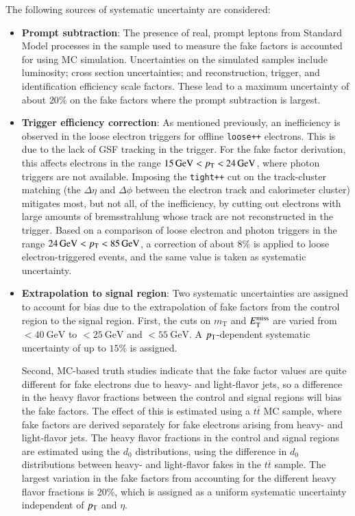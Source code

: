The following sources of systematic uncertainty are considered:
\begin{itemize}
  \item \textbf{Prompt subtraction}: The presence of real, prompt leptons from Standard Model processes in the sample used to measure the fake factors is accounted for using MC simulation. Uncertainties on the simulated samples include luminosity; cross section uncertainties; and reconstruction, trigger, and identification efficiency scale factors. These lead to a maximum uncertainty of about $20\%$ on the fake factors where the prompt subtraction is largest. 
  \item \textbf{Trigger efficiency correction}: As mentioned previously, an inefficiency is observed in the loose electron triggers for offline \texttt{loose++} electrons. This is due to the lack of GSF tracking in the trigger. For the fake factor derivation, this affects electrons in the range $\SI{15}{\giga\electronvolt}<p_{\text{T}}<\SI{24}{\giga\electronvolt}$, where photon triggers are not available. Imposing the \texttt{tight++} cut on the track-cluster matching (the $\Delta \eta$ and $\Delta \phi$ between the electron track and calorimeter cluster) mitigates most, but not all, of the inefficiency, by cutting out electrons with large amounts of bremsstrahlung whose track are not reconstructed in the trigger. Based on a comparison of loose electron and photon triggers in the range $\SI{24}{\giga\electronvolt}<p_{\text{T}}<\SI{85}{\giga\electronvolt}$, a correction of about $8\%$ is applied to loose electron-triggered events, and the same value is taken as systematic uncertainty.
  \item \textbf{Extrapolation to signal region}: Two systematic uncertainties are assigned to account for bias due to the extrapolation of fake factors from the control region to the signal region. First, the cuts on $m_{\mathrm{T}}$ and $E_{\text{T}}^{\text{miss}}$ are varied from $<\SI{40}{\giga\electronvolt}$ to $<\SI{25}{\giga\electronvolt}$ and $<\SI{55}{\giga\electronvolt}$. A $p_{\text{T}}$-dependent systematic uncertainty of up to $15\%$ is assigned. 

  Second, MC-based truth studies indicate that the fake factor values are quite different for fake electrons due to heavy- and light-flavor jets, so a difference in the heavy flavor fractions between the control and signal regions will bias the fake factors. The effect of this is estimated using a $t\overline{t}$ MC sample, where fake factors are derived separately for fake electrons arising from heavy- and light-flavor jets. The heavy flavor fractions in the control and signal regions are estimated using the $d_0$ distributions, using the difference in $d_0$ distributions between heavy- and light-flavor fakes in the $t\overline{t}$ sample. The largest variation in the fake factors from accounting for the different heavy flavor fractions is 20\%, which is assigned as a uniform systematic uncertainty independent of $p_{\text{T}}$ and $\eta$. 
\end{itemize}

